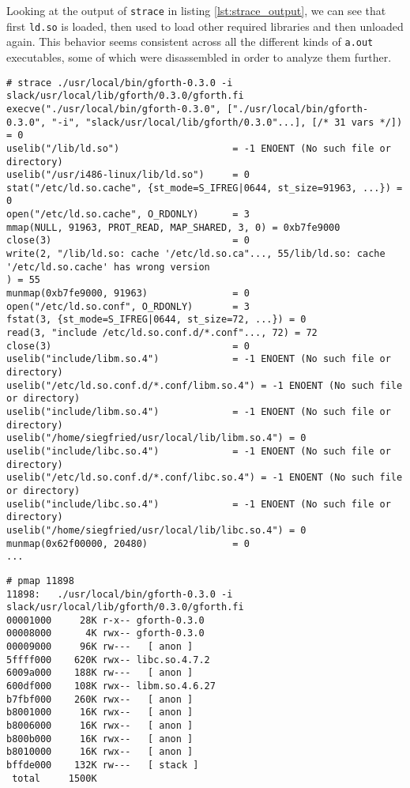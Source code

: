 \documentclass{article}
\begin{document}
Looking at the output of \texttt{strace} in listing \ref{lst:strace_output}, we can see that first \texttt{ld.so} is loaded, then used to load other required libraries and then unloaded again. This behavior seems consistent across all the different kinds of \texttt{a.out} executables, some of which were disassembled in order to analyze them further.

\begin{lstlisting}[caption={(Shortened) output of \texttt{strace} showing the system calls that are executed}, label={lst:strace_output}]
# strace ./usr/local/bin/gforth-0.3.0 -i slack/usr/local/lib/gforth/0.3.0/gforth.fi
execve("./usr/local/bin/gforth-0.3.0", ["./usr/local/bin/gforth-0.3.0", "-i", "slack/usr/local/lib/gforth/0.3.0"...], [/* 31 vars */]) = 0
uselib("/lib/ld.so")                    = -1 ENOENT (No such file or directory)
uselib("/usr/i486-linux/lib/ld.so")     = 0
stat("/etc/ld.so.cache", {st_mode=S_IFREG|0644, st_size=91963, ...}) = 0
open("/etc/ld.so.cache", O_RDONLY)      = 3
mmap(NULL, 91963, PROT_READ, MAP_SHARED, 3, 0) = 0xb7fe9000
close(3)                                = 0
write(2, "/lib/ld.so: cache '/etc/ld.so.ca"..., 55/lib/ld.so: cache '/etc/ld.so.cache' has wrong version
) = 55
munmap(0xb7fe9000, 91963)               = 0
open("/etc/ld.so.conf", O_RDONLY)       = 3
fstat(3, {st_mode=S_IFREG|0644, st_size=72, ...}) = 0
read(3, "include /etc/ld.so.conf.d/*.conf"..., 72) = 72
close(3)                                = 0
uselib("include/libm.so.4")             = -1 ENOENT (No such file or directory)
uselib("/etc/ld.so.conf.d/*.conf/libm.so.4") = -1 ENOENT (No such file or directory)
uselib("include/libm.so.4")             = -1 ENOENT (No such file or directory)
uselib("/home/siegfried/usr/local/lib/libm.so.4") = 0
uselib("include/libc.so.4")             = -1 ENOENT (No such file or directory)
uselib("/etc/ld.so.conf.d/*.conf/libc.so.4") = -1 ENOENT (No such file or directory)
uselib("include/libc.so.4")             = -1 ENOENT (No such file or directory)
uselib("/home/siegfried/usr/local/lib/libc.so.4") = 0
munmap(0x62f00000, 20480)               = 0
...
\end{lstlisting}

\begin{lstlisting}[caption={Output of \texttt{pmap} showing the memory mappings of an \texttt{a.out} binary, that loads additional libraries at runtime}, label={lst:pmap_example}]
# pmap 11898
11898:   ./usr/local/bin/gforth-0.3.0 -i slack/usr/local/lib/gforth/0.3.0/gforth.fi
00001000     28K r-x-- gforth-0.3.0
00008000      4K rwx-- gforth-0.3.0
00009000     96K rw---   [ anon ]
5ffff000    620K rwx-- libc.so.4.7.2
6009a000    188K rw---   [ anon ]
600df000    108K rwx-- libm.so.4.6.27
b7fbf000    260K rwx--   [ anon ]
b8001000     16K rwx--   [ anon ]
b8006000     16K rwx--   [ anon ]
b800b000     16K rwx--   [ anon ]
b8010000     16K rwx--   [ anon ]
bffde000    132K rw---   [ stack ]
 total     1500K
\end{lstlisting}
\end{document}
